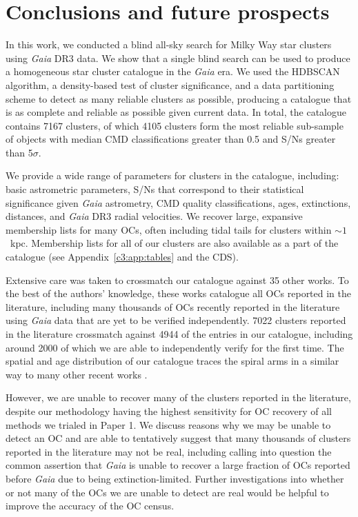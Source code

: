 \section{Conclusions and future prospects}\label{c3:sec:conclusion}  %

In this work, we conducted a blind all-sky search for Milky Way star clusters using \emph{Gaia} DR3 data. We show that a single blind search can be used to produce a homogeneous star cluster catalogue in the \emph{Gaia} era. We used the HDBSCAN algorithm, a density-based test of cluster significance, and a data partitioning scheme to detect as many reliable clusters as possible, producing a catalogue that is as complete and reliable as possible given current data. In total, the catalogue contains 7167 clusters, of which 4105 clusters form the most reliable sub-sample of objects with median CMD classifications greater than 0.5 and S/Ns greater than 5$\sigma$.

We provide a wide range of parameters for clusters in the catalogue, including: basic astrometric parameters, S/Ns that correspond to their statistical significance given \emph{Gaia} astrometry, CMD quality classifications, ages, extinctions, distances, and \emph{Gaia} DR3 radial velocities. We recover large, expansive membership lists for many OCs, often including tidal tails for clusters within $\sim 1$~kpc. Membership lists for all of our clusters are also available as a part of the catalogue (see Appendix~\ref{c3:app:tables} and the CDS).

Extensive care was taken to crossmatch our catalogue against 35 other works. To the best of the authors' knowledge, these works catalogue all OCs reported in the literature, including many thousands of OCs recently reported in the literature using \emph{Gaia} data that are yet to be verified independently. 7022 clusters reported in the literature crossmatch against 4944 of the entries in our catalogue, including around 2000 of which we are able to independently verify for the first time. The spatial and age distribution of our catalogue traces the spiral arms in a similar way to many other recent works \citep[e.g.][]{cantat-gaudin_painting_2020, castro-ginard_milky_2021}.

However, we are unable to recover many of the clusters reported in the literature, despite our methodology having the highest sensitivity for OC recovery of all methods we trialed in Paper 1. We discuss reasons why we may be unable to detect an OC and are able to tentatively suggest that many thousands of clusters reported in the literature may not be real, including calling into question the common assertion that \emph{Gaia} is unable to recover a large fraction of OCs reported before \emph{Gaia} due to being extinction-limited. Further investigations into whether or not many of the OCs we are unable to detect are real would be helpful to improve the accuracy of the OC census.

